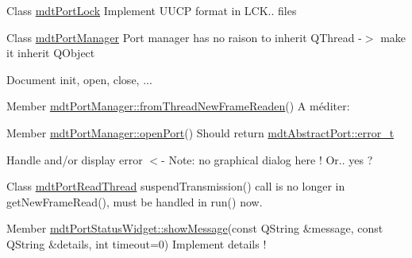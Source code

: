 \label{todo__todo000029}
\hypertarget{todo__todo000029}{}
 
\begin{DoxyDescription}
\item[Class \hyperlink{classmdt_port_lock}{mdtPortLock} ]Implement UUCP format in LCK.. files 
\end{DoxyDescription}

\label{todo__todo000041}
\hypertarget{todo__todo000041}{}
 
\begin{DoxyDescription}
\item[Class \hyperlink{classmdt_port_manager}{mdtPortManager} ]Port manager has no raison to inherit QThread -\/$>$ make it inherit QObject 

Document init, open, close, ...
\end{DoxyDescription}

\label{todo__todo000040}
\hypertarget{todo__todo000040}{}
 
\begin{DoxyDescription}
\item[Member \hyperlink{classmdt_port_manager_a4fcc8f0699b655156e661bb3de6056cc}{mdtPortManager::fromThreadNewFrameReaden}() ]A méditer: 
\end{DoxyDescription}

\label{todo__todo000043}
\hypertarget{todo__todo000043}{}
 
\begin{DoxyDescription}
\item[Member \hyperlink{classmdt_port_manager_aab594613e8985590c835194efbc27b5e}{mdtPortManager::openPort}() ]Should return \hyperlink{classmdt_abstract_port_ad4121bb930c95887e77f8bafa065a85e}{mdtAbstractPort::error\_\-t} 

Handle and/or display error $<$-\/ Note: no graphical dialog here ! Or.. yes ? 
\end{DoxyDescription}

\label{todo__todo000045}
\hypertarget{todo__todo000045}{}
 
\begin{DoxyDescription}
\item[Class \hyperlink{classmdt_port_read_thread}{mdtPortReadThread} ]suspendTransmission() call is no longer in getNewFrameRead(), must be handled in run() now. 
\end{DoxyDescription}

\label{todo__todo000046}
\hypertarget{todo__todo000046}{}
 
\begin{DoxyDescription}
\item[Member \hyperlink{classmdt_port_status_widget_a8fce28ddb290512f5681cf800ac17b81}{mdtPortStatusWidget::showMessage}(const QString \&message, const QString \&details, int timeout=0) ]Implement details ! 
\end{DoxyDescription}

